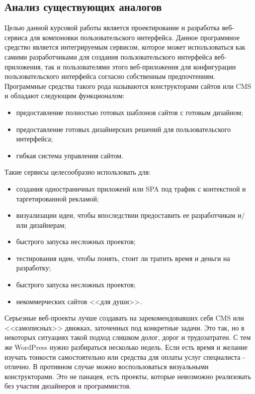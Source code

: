 \subsection{Анализ существующих аналогов}
\label{sec:analysis:analogues}

Целью данной курсовой работы является проектирование и разработка веб-сервиса для компоновки пользовательского интерфейса. 
Данное программное средство является интегрируемым сервисом, которое может использоваться как самими разработчиками для создания пользовательского интерфейса веб-приложения, так и пользователями этого веб-приложения для конфигурации пользовательского интерфейса согласно собственным предпочтениям.
Программные средства такого рода называются конструкторами сайтов или CMS~\cite{cms} и обладают следующим функционалом:

\begin{itemize}
  \item предоставление полностью готовых шаблонов сайтов с готовым дизайном;
  \item предоставление готовых дизайнерских решений для пользовательского интерфейса;
  \item гибкая система управления сайтом.
\end{itemize}

Такие сервисы целесообразно использовать для:
\begin{itemize}
  \item создания одностраничных приложеий или SPA под трафик с контекстной и таргетированной рекламой;
  \item визуализации идеи, чтобы впоследствии предоставить ее разработчикам и/или дизайнерам;
  \item быстрого запуска несложных проектов;
  \item тестирования идеи, чтобы понять, стоит ли тратить время и деньги на разработку;
  \item быстрого запуска несложных проектов;
  \item некоммерческих сайтов <<для души>>.
\end{itemize}	

Серьезные веб-проекты лучше создавать на зарекомендовавших себя CMS или <<самописных>> движках, заточенных под конкретные задачи. Это так, но в некоторых ситуациях такой подход слишком долог, дорог и трудозатратен. С тем же WordPress нужно разбираться несколько недель. Если есть время и желание изучать тонкости самостоятельно или средства для оплаты услуг специалиста - отлично. В противном случае можно воспользоваться визуальными конструкторами. Это не панацея, есть проекты, которые невозможно реализовать без участия дизайнеров и программистов.


